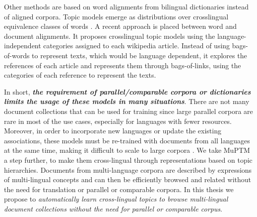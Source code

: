 Other methods are based on word alignments from bilingual dictionaries instead of aligned corpora. Topic models emerge as distributions over crosslingual equivalence classes of words \citep{Jagarlamudi2010, zhang-etal-2010-cross, hao-paul-2018-learning}. A recent approach is placed between word and document alignments. It proposes crosslingual topic models using the language-independent categories assigned to each wikipedia article\citep{2020arXiv200911207P}. Instead of using bags-of-words to represent texts, which would be language dependent, it explores the references of each article and represents them through bags-of-links, using the categories of each reference to represent the texts.

In short, \textbf{\textit{the requirement of parallel/comparable corpora or dictionaries limits the usage of these models in many situations}}. There are not many document collections that can be used for training since large parallel corpora are rare in most of the use cases, especially for languages with fewer resources. Moreover, in order to incorporate new languages or update the existing associations, these models must be re-trained with documents from all languages at the same time, making it difficult to scale to large corpora \citep{Hao2018, Moritz2017}. We take MuPTM a step further, to make them cross-lingual through representations based on topic hierarchies. Documents from multi-language corpora are described by expressions of multi-lingual concepts and can then be efficiently browsed and related without the need for translation or parallel or comparable corpora. In this thesis we propose to \textit{automatically learn cross-lingual topics to browse multi-lingual document collections without the need for parallel or comparable corpus}. 
